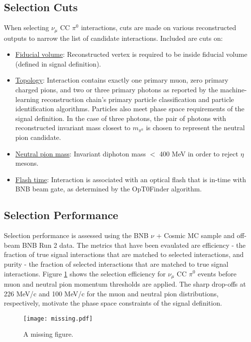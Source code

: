 \documentclass[../main.tex]{subfiles}
\begin{document}
\subsection{Selection Cuts}
When selecting $\nu_{\mu}$ CC $\pi^{0}$ interactions, cuts are made on various reconstructed outputs to narrow the list of candidate interactions.  Included are cuts on:
\begin{itemize}
    \item \underline{Fiducial volume}: Reconstructed vertex is required to be inside fiducial volume (defined in signal definition).
    \item \underline{Topology}: Interaction contains exactly one primary muon, zero primary charged pions, and two or three primary photons as reported by the machine-learning reconstruction chain's primary particle classification and particle identification algorithms.  Particles also meet phase space requirements of the signal definition.  In the case of three photons, the pair of photons with reconstructed invariant mass closest to $m_{\pi^{0}}$ is chosen to represent the neutral pion candidate.
    \item \underline{Neutral pion mass}: Invariant diphoton mass $<$ 400 MeV in order to reject $\eta$ mesons.
    \item \underline{Flash time}: Interaction is associated with an optical flash that is in-time with BNB beam gate, as determined by the OpT0Finder algorithm.
\end{itemize}

\subsection{Selection Performance}
Selection performance is assessed using the BNB $\nu$ + Cosmic MC sample and off-beam BNB Run 2 data.  The metrics that have been evaulated are efficiency - the fraction of true signal interactions that are matched to selected interactions, and purity - the fraction of selected interactions that are matched to true signal interactions.  Figure \ref{fig:efficiency_momentum} shows the selection efficiency for $\nu_{\mu}$ CC $\pi^{0}$ events before muon and neutral pion momentum thresholds are applied.  The sharp drop-offs at 226 MeV/c and 100 MeV/c for the muon and neutral pion distributions, respectively, motivate the phase space constraints of the signal definition.

\begin{figure}[H]
    \center
    \texttt{[image: missing.pdf]}
    \caption[text]{A missing figure.}
    \label{fig:efficiency_momentum}
\end{figure}
\end{document}
